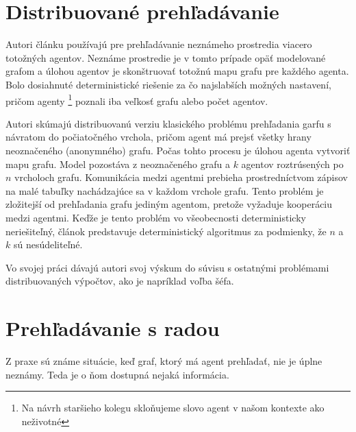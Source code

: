 \section{Distribuované prehľadávanie}
Autori článku \cite{DEA} používajú pre prehľadávanie neznámeho prostredia
viacero totožných agentov. Neznáme prostredie je v tomto prípade opäť
modelované grafom a úlohou agentov je skonštruovať totožnú mapu grafu pre
každého agenta. Bolo dosiahnuté deterministické riešenie za čo najslabších možných
nastavení, pričom agenty \footnote{Na návrh staršieho kolegu skloňujeme
slovo agent v našom kontexte ako neživotné} poznali iba veľkosť grafu alebo
počet agentov.

Autori skúmajú distribuovanú verziu
klasického problému prehľadania garfu s návratom do počiatočného vrchola,
pričom agent má prejsť všetky hrany neoznačeného (anonymného) grafu. Počas
tohto procesu je úlohou agenta vytvoriť mapu grafu. Model pozostáva z
neoznačeného grafu a $k$ agentov roztrúsených po $n$ vrcholoch grafu.
Komunikácia medzi agentmi prebieha prostredníctvom zápisov na malé tabuľky
nachádzajúce sa v každom vrchole grafu. Tento problém je zložitejší od
prehľadania grafu jediným agentom, pretože vyžaduje kooperáciu medzi
agentmi. Keďže je tento problém vo všeobecnosti deterministicky
neriešiteľný, článok predstavuje deterministický algoritmus za podmienky, že
$n$ a $k$ sú nesúdeliteľné.

Vo svojej práci dávajú autori
svoj výskum do súvisu s ostatnými problémami distribuovaných výpočtov, ako
je napríklad voľba šéfa.

\section{Prehľadávanie s radou}
Z praxe sú známe situácie, keď graf, ktorý má agent prehľadať, nie je úplne
neznámy. Teda je o ňom dostupná nejaká informácia. 
